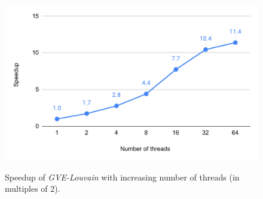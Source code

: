 \begin{figure}[hbtp]
  \centering
  \includegraphics[width=0.98\linewidth]{out/louvain-ss.pdf} \\[0ex]
  \caption{Speedup of \textit{GVE-Louvain} with increasing number of threads (in multiples of 2).}
  \label{fig:louvain-ss}
\end{figure}
